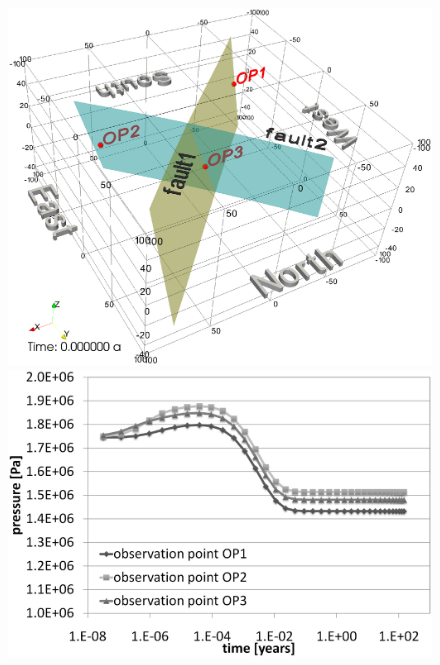 \begin{figure}[htbp]
    \begin{center}
        \begin{minipage}{0.40\textwidth}
            \includegraphics[width=1\textwidth]{PART_II/T/2u2f_fig6a.eps}
        \end{minipage}
        \begin{minipage}{0.40\textwidth}
            \includegraphics[width=1\textwidth]{PART_II/T/2u2f_fig6b.eps}
        \end{minipage}
        \begin{minipage}{0.40\textwidth}

\end{minipage}
\end{center}
\end{figure}
